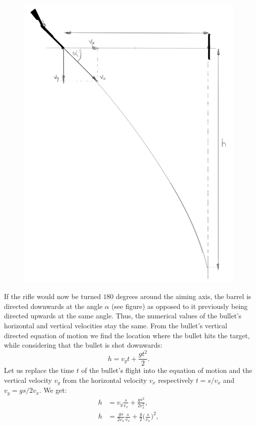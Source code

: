 {\begin{figure}
	\includegraphics[width = \linewidth]{2016-v2g-06-Lasketiir-2.PNG}
\end{figure}
If the rifle would now be turned $180$ degrees around the aiming axis, the barrel is directed downwards at the angle $\alpha$ (see figure) as opposed to it previously being directed upwards at the same angle. Thus, the numerical values of the bullet’s horizontal and vertical velocities stay the same. From the bullet’s vertical directed equation of motion we find the location where the bullet hits the target, while considering that the bullet is shot downwards:
$$
h=v_{y}t+\frac{gt^2}{2}.
$$ 
Let us replace the time $t$ of the bullet’s flight into the equation of motion and the vertical velocity $v_y$ from the horizontal velocity $v_x$ respectively $t=s / v_x$ and $v_y = gs/2v_x$. We get:
\begin{align*}
h & = v_{y}\frac{s}{v_{x}}+\frac{gs^2}{2v_{x}^2},\\
h & = \frac{gs}{2v_x}\frac{s}{v_{x}}+\frac{g}{2}\Big(\frac{s}{v_{x}}\Big)^2,\\

\end{align*}}
